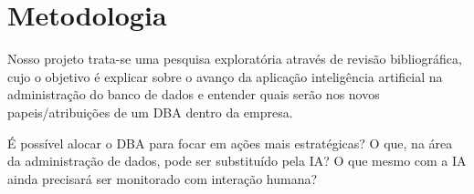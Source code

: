 \chapter{Metodologia}

Nosso projeto trata-se uma pesquisa exploratória através de revisão bibliográfica, cujo o objetivo é explicar sobre o avanço da aplicação inteligência artificial na administração do banco de dados e entender quais serão nos novos papeis/atribuições de um DBA dentro da empresa.


É possível alocar o DBA para focar em ações mais estratégicas? O que, na área da administração de dados, pode ser substituído pela IA? O que mesmo com a IA ainda precisará ser monitorado com interação humana?


